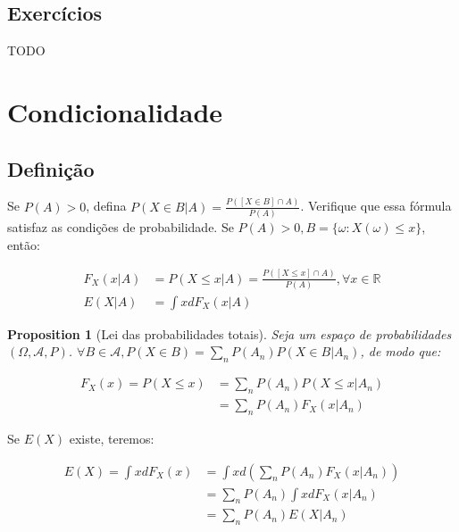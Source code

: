 \documentclass[
]{article}
\newtheorem{proposition}{Proposition}[section]
\theoremstyle{definition}
\theoremstyle{definition}
\theoremstyle{definition}
\theoremstyle{definition}
\theoremstyle{remark}
\begin{document}
\newpage

\hypertarget{exercuxedcios-2}{%
\subsection{Exercícios}\label{exercuxedcios-2}}

TODO

\newpage

\hypertarget{condicionalidade}{%
\section{Condicionalidade}\label{condicionalidade}}

\hypertarget{definiuxe7uxe3o-1}{%
\subsection{Definição}\label{definiuxe7uxe3o-1}}

Se \(P(A) > 0\), defina \(P(X \in B|A) = \frac{P([X \in B] \cap A)}{P(A)}\). Verifique que essa fórmula satisfaz as condições de probabilidade. Se \(P(A) > 0, B = \{\omega : X(\omega) \le x\}\), então:

\begin{align*}
F_{X}(x|A) &= P(X \le x|A) = \frac{P([X \le x] \cap A)}{P(A)}, \forall x \in \mathbb{R} \\
E(X|A) &= \int xdF_{X}(x|A)
\end{align*}

\begin{proposition}[Lei das probabilidades totais]
Seja um espaço de probabilidades \((\Omega,\mathcal{A},P)\). \(\forall B \in \mathcal{A}, P(X \in B) = \sum_{n}P(A_{n})P(X \in B |A_{n})\), de modo que:

\begin{align*}
F_{X}(x) = P(X \le x) &= \sum_{n}P(A_{n})P(X \le x|A_{n}) \\
&= \sum_{n}P(A_{n})F_{X}(x|A_{n})
\end{align*}
\end{proposition}

Se \(E(X)\) existe, teremos:

\begin{align*}
E(X) = \int xdF_{X}(x) &= \int xd\left(\sum_{n}P(A_{n})F_{X}(x|A_{n})\right) \\
&= \sum_{n}P(A_{n})\int xdF_{X}(x|A_{n}) \\
&= \sum_{n}P(A_{n})E(X|A_{n})
\end{align*}
\end{document}
